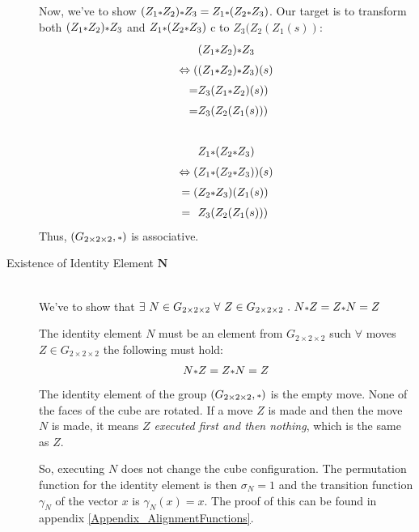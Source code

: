 \documentclass[12pt,a4paper]{article}
\theoremstyle{custom}
\newcommand{\Gtwo}{\ensuremath{G_{2\times 2\times 2}}}
\begin{document}
\begin{description}
Now, we've to show $(Z_1 \mathlarger{\scriptstyle*} Z_2) \mathlarger{\scriptstyle*} Z_3 = Z_1 \mathlarger{\scriptstyle*} (Z_2 \mathlarger{\scriptstyle*} Z_3)$. Our target is to transform both $(Z_1 \mathlarger{\scriptstyle*} Z_2) \mathlarger{\scriptstyle*} Z_3$ and $Z_1 \mathlarger{\scriptstyle*} (Z_2 \mathlarger{\scriptstyle*} Z_3)$ c to $Z_3(Z_2(Z_1(s))$:
\begin{align*}
& (Z_1 \mathlarger{\scriptstyle*} Z_2) \mathlarger{\scriptstyle*} Z_3 \\
\Leftrightarrow (&(Z_1 \mathlarger{\scriptstyle*} Z_2) \mathlarger{\scriptstyle*} Z_3)(s) \\
= & Z_3(Z_1 \mathlarger{\scriptstyle*} Z_2)(s)) \\
= & Z_3(Z_2(Z_1(s)))
\\
\\
&Z_1 \mathlarger{\scriptstyle*} (Z_2 \mathlarger{\scriptstyle*} Z_3) \\
\Leftrightarrow (&Z_1 \mathlarger{\scriptstyle*} (Z_2 \mathlarger{\scriptstyle*} Z_3))(s) \\
= (&Z_2 \mathlarger{\scriptstyle*} Z_3)(Z_1(s)) \\
= \ \ & Z_3(Z_2(Z_1(s)))
\end{align*}
Thus, $(\Gtwo, \mathlarger{\scriptstyle*})$ is associative.


\item [Existence of  Identity Element $\boldsymbol{N}$] \ \\

We've to show that $\exists \ N \in \Gtwo \ \forall \ Z \in \Gtwo \ . \ N \mathlarger{\scriptstyle*} Z = Z \mathlarger{\scriptstyle*} N = Z$


The identity element $N$ must be an element from $\Gtwo$ such $\forall$ moves $Z \in \Gtwo$ the following must hold:
\begin{align*}
N \mathlarger{\scriptstyle*} Z = Z \mathlarger{\scriptstyle*} N = Z
\end{align*}
The identity element of the group $(\Gtwo, \mathlarger{\scriptstyle*})$ is the empty move. None of the faces of the cube are rotated. If a move $Z$ is made and then the move $N$ is made, it means \textit{ $Z$ executed first and then nothing}, which is the same as \textit{ $Z$}.

So, executing $N$ does not change the cube configuration. The permutation function for the identity element is then $\sigma_N=1$ and the transition function $\gamma_N$ of the vector $x$ is $\gamma_N(x)=x$. The proof of this can be found in appendix \ref{Appendix_AlignmentFunctions}.


\end{description}
\end{document}
